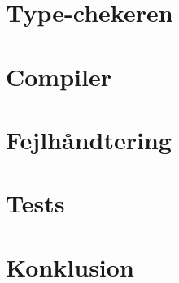 \documentclass[12pt,a4paper,danish]{article}
\begin{document}
\section*{Type-chekeren}%

\section*{Compiler}%
%

\section*{Fejlhåndtering}%

\section*{Tests}%



\section*{Konklusion}%






\end{document}
